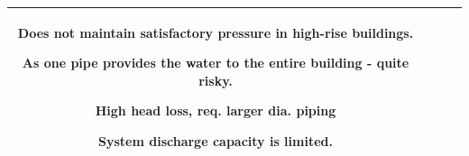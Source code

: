 \documentclass{article}
\begin{document}
\begin{table}[h!]
\begin{tabular}{  c m{4cm} | m{3.1cm} |  m{3.1cm} |}
       \begin{itemize}[leftmargin=*]
      \scriptsize{
        \item Does not maintain satisfactory pressure in high-rise buildings.
        \item As one pipe provides the water to the entire building  - quite risky.
        \item High head loss, req. larger dia. piping
        \item System discharge capacity is limited.}
      \end{itemize}
    \\ \hline
   \end{tabular}
\end{table}


\vspace{-2em} 
\end{document}
